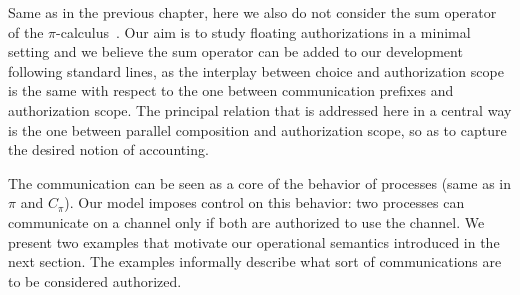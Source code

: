 Same as in the previous chapter, here we also do not consider the sum operator of the $\pi$-calculus~\cite{pi_calculus}. Our aim is to study floating authorizations in a minimal setting and  we believe the sum operator can be added to our development following standard lines, as the interplay between choice and authorization scope is the same with respect to the one between communication prefixes and authorization scope. %
The principal relation that is addressed here in a central way is the one between parallel composition and authorization scope, so as to capture the desired notion of accounting.

The communication can be seen as a core of the behavior of processes (same as in $\pi$ and $C_\pi$). Our model imposes control on this behavior: two processes can communicate on a channel only if both are authorized to use the channel. 
We present two examples that motivate our operational semantics introduced in the next section. The examples informally describe what sort of communications are to be considered authorized.
